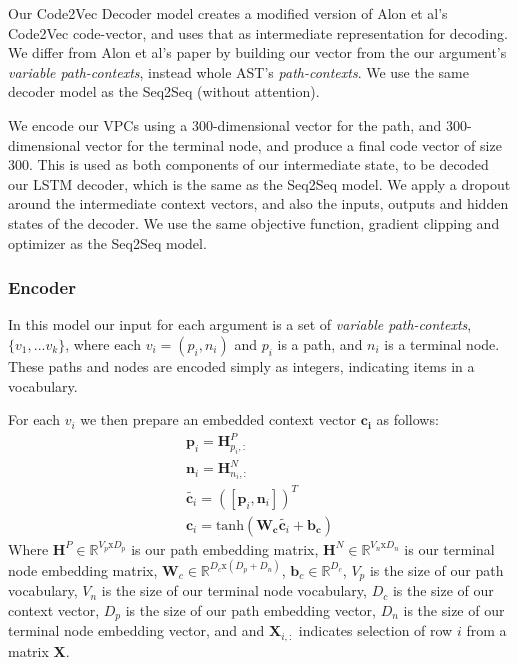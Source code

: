Our Code2Vec Decoder model creates a modified version of Alon et al's \cite{alon_code2vec_2018} Code2Vec code-vector, and uses that as intermediate representation for decoding. We differ from Alon et al's paper by building our vector from the our argument's \textit{variable path-contexts}, instead whole AST's \textit{path-contexts}.
We use the same decoder model as the Seq2Seq (without attention).

We encode our VPCs using a 300-dimensional vector for the path, and 300-dimensional vector for the terminal node, and produce a final code vector of size 300.
This is used as both components of our intermediate state, to be decoded our LSTM decoder, which is the same as the Seq2Seq model.
We apply a dropout around the intermediate context vectors, and also the inputs, outputs and hidden states of the decoder. 
We use the same objective function, gradient clipping and optimizer as the Seq2Seq model.

\subsubsection{Encoder}

In this model our input for each argument is a set of \textit{variable path-contexts}, $\{v_1,...v_k\}$, where each $v_i = (p_i, n_i)$ and  $p_i$ is a path, and $n_i$ is a terminal node. These paths and nodes are encoded simply as integers, indicating items in a vocabulary.

For each $v_i$ we then prepare an embedded context vector $\mathbf{c_i}$ as follows:
\begin{align}
\textbf{p}_i = \mathbf{H}^P_{p_i,:}\\
\textbf{n}_i = \mathbf{H}^N_{n_i,:}\\
\tilde{\textbf{c}_i} = ([\textbf{p}_i , \textbf{n}_i])^T \\
\textbf{c}_i = \text{tanh}(\mathbf{W_c}\tilde{\textbf{c}_i}  + \mathbf{b_c})
\end{align}
Where  $\textbf{H}^P \in \mathbb{R}^{V_p\text{x}D_p}$ is our path embedding matrix, 
$\textbf{H}^N \in \mathbb{R}^{V_n\text{x}D_n}$ is our terminal node embedding matrix, 
$\textbf{W}_c \in \mathbb{R}^{D_c\text{x}(D_p+D_n)}$,
$\textbf{b}_c \in \mathbb{R}^{D_c}$,
$V_p$ is the size of our path vocabulary,
$V_n$ is the size of our terminal node vocabulary,
$D_c$ is the size of our context vector,
$D_p$ is the size of our path embedding vector,
$D_n$ is the size of our terminal node embedding vector, and
and $\textbf{X}_{i,:}$ indicates selection of row $i$ from a matrix \textbf{X}.

